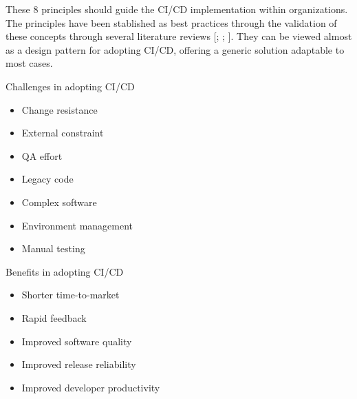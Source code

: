 These 8 principles should guide the CI/CD implementation within organizations. The principles have been stablished as best practices through the validation of these concepts through several literature reviews [\cite{Rodriguez2016}; \cite{Mantyla2015}; \cite{Stahl2014}]. They can be viewed almost as a design pattern for adopting CI/CD, offering a generic solution adaptable to most cases.

Challenges in adopting CI/CD\\
\begin{itemize}
\item Change resistance
\item External constraint
\item QA effort
\item Legacy code
\item Complex software
\item Environment management 
\item Manual testing
\end{itemize}

Benefits in adopting CI/CD\\
\begin{itemize}
\item Shorter time-to-market
\item Rapid feedback
\item Improved software quality
\item Improved release reliability
\item Improved developer productivity
\end{itemize}